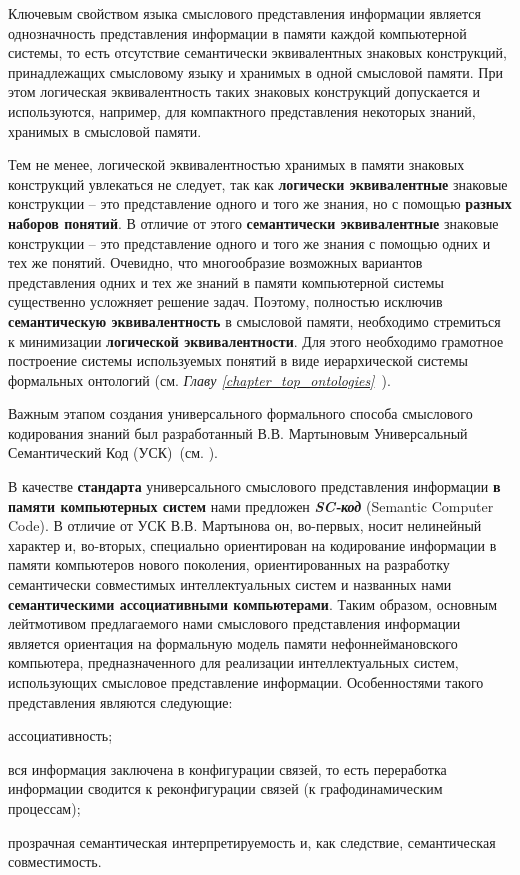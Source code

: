 Ключевым свойством языка смыслового представления информации является однозначность представления информации в памяти каждой компьютерной системы, то есть отсутствие семантически эквивалентных знаковых конструкций, принадлежащих смысловому языку и хранимых в одной смысловой памяти. При этом логическая эквивалентность таких знаковых конструкций допускается и используются, например, для компактного представления некоторых знаний, хранимых в смысловой памяти.

Тем не менее, логической эквивалентностью хранимых в памяти знаковых конструкций увлекаться не следует, так как \textbf{логически эквивалентные} знаковые конструкции -- это представление одного и того же знания, но с помощью \textbf{разных наборов понятий}. В отличие от этого \textbf{семантически эквивалентные} знаковые конструкции -- это представление одного и того же знания с помощью одних и тех же понятий. Очевидно, что многообразие возможных вариантов представления одних и тех же знаний в памяти компьютерной системы существенно усложняет решение задач. Поэтому, полностью исключив \textbf{семантическую эквивалентность} в смысловой памяти, необходимо стремиться к минимизации \textbf{логической эквивалентности}. Для этого необходимо грамотное построение системы используемых понятий в виде иерархической системы формальных онтологий (см. \textit{Главу \ref{chapter_top_ontologies}~}).

Важным этапом создания универсального формального способа смыслового кодирования знаний был разработанный В.В. Мартыновым Универсальный Семантический Код (УСК)~(см. ).

В качестве \textbf{стандарта} универсального смыслового представления информации \textbf{в памяти компьютерных систем} нами предложен \textbf{\textit{SC-код}} (Semantic Computer Code). В отличие от УСК В.В. Мартынова он, во-первых, носит нелинейный характер и, во-вторых, специально ориентирован на кодирование информации в памяти компьютеров нового поколения, ориентированных на разработку семантически совместимых интеллектуальных систем и названных нами \textbf{семантическими ассоциативными компьютерами}. Таким образом, основным лейтмотивом предлагаемого нами смыслового представления информации является ориентация на формальную модель памяти нефоннеймановского компьютера, предназначенного для реализации интеллектуальных систем, использующих смысловое представление информации. Особенностями такого представления являются следующие:
\begin{textitemize}
	\item ассоциативность;
	\item вся информация заключена в конфигурации связей, то есть переработка информации сводится к реконфигурации связей (к графодинамическим процессам);
	\item прозрачная семантическая интерпретируемость и, как следствие, семантическая совместимость.
\end{textitemize}

